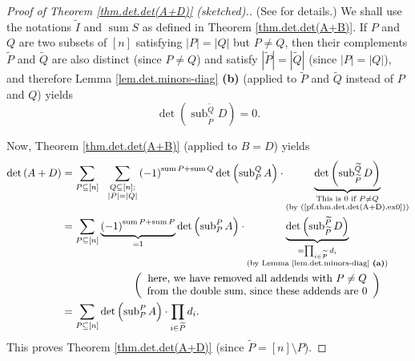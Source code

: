 \begin{proof}
[Proof of Theorem \ref{thm.det.det(A+D)} (sketched).](See \cite[Corollary
6.162]{detnotes} for details.) We shall use the notations $\widetilde{I}$ and
$\operatorname*{sum}S$ as defined in Theorem \ref{thm.det.det(A+B)}. If $P$
and $Q$ are two subsets of $\left[  n\right]  $ satisfying $\left\vert
P\right\vert =\left\vert Q\right\vert $ but $P\neq Q$, then their complements
$\widetilde{P}$ and $\widetilde{Q}$ are also distinct (since $P\neq Q$) and
satisfy $\left\vert \widetilde{P}\right\vert =\left\vert \widetilde{Q}%
\right\vert $ (since $\left\vert P\right\vert =\left\vert Q\right\vert $), and
therefore Lemma \ref{lem.det.minors-diag} \textbf{(b)} (applied to
$\widetilde{P}$ and $\widetilde{Q}$ instead of $P$ and $Q$) yields%
\begin{equation}
\det\left(  \operatorname*{sub}\nolimits_{\widetilde{P}}^{\widetilde{Q}%
}D\right)  =0. \label{pf.thm.det.det(A+D).ex0}%
\end{equation}


Now, Theorem \ref{thm.det.det(A+B)} (applied to $B=D$) yields%
\begin{align*}
\det\left(  A+D\right)   &  =\sum_{P\subseteq\left[  n\right]  }%
\ \ \sum_{\substack{Q\subseteq\left[  n\right]  ;\\\left\vert P\right\vert
=\left\vert Q\right\vert }}\left(  -1\right)  ^{\operatorname*{sum}%
P+\operatorname*{sum}Q}\det\left(  \operatorname*{sub}\nolimits_{P}%
^{Q}A\right)  \cdot\underbrace{\det\left(  \operatorname*{sub}%
\nolimits_{\widetilde{P}}^{\widetilde{Q}}D\right)  }_{\substack{\text{This is
}0\text{ if }P\neq Q\\\text{(by (\ref{pf.thm.det.det(A+D).ex0}))}}}\\
&  =\sum_{P\subseteq\left[  n\right]  }\underbrace{\left(  -1\right)
^{\operatorname*{sum}P+\operatorname*{sum}P}}_{=1}\det\left(
\operatorname*{sub}\nolimits_{P}^{P}A\right)  \cdot\underbrace{\det\left(
\operatorname*{sub}\nolimits_{\widetilde{P}}^{\widetilde{P}}D\right)
}_{\substack{=\prod_{i\in\widetilde{P}}d_{i}\\\text{(by Lemma
\ref{lem.det.minors-diag} \textbf{(a)})}}}\\
&  \ \ \ \ \ \ \ \ \ \ \ \ \ \ \ \ \ \ \ \ \left(
\begin{array}
[c]{c}%
\text{here, we have removed all addends with }P\neq Q\\
\text{from the double sum, since these addends are }0
\end{array}
\right) \\
&  =\sum_{P\subseteq\left[  n\right]  }\det\left(  \operatorname*{sub}%
\nolimits_{P}^{P}A\right)  \cdot\prod_{i\in\widetilde{P}}d_{i}.
\end{align*}
This proves Theorem \ref{thm.det.det(A+D)} (since $\widetilde{P}=\left[
n\right]  \setminus P$).
\end{proof}

